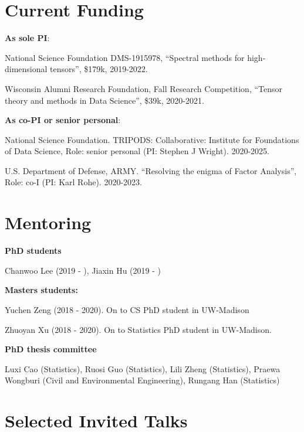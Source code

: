 \documentclass[letterpaper]{article}
\renewenvironment{itemize}{
  \begin{list}{}{
    \setlength{\leftmargin}{1.5em}
  }
}{
  \end{list}
}
\begin{document}
\section*{Current Funding}
{\bf As sole PI}:
\begin{itemize}
\item National Science Foundation DMS-1915978, ``Spectral methods for high-dimensional tensors'', \$179k, 2019-2022. 
\item Wisconsin Alumni Research Foundation, Fall Research Competition, ``Tensor theory and methods in Data Science'', \$39k, 2020-2021.
\end{itemize}
{\bf As co-PI or senior personal}:
\begin{itemize}
\item National Science Foundation. TRIPODS: Collaborative: Institute for Foundations of Data Science, Role: senior personal (PI: Stephen J Wright). 2020-2025. 
\item U.S. Department of Defense, ARMY. ``Resolving the enigma of Factor Analysis'', Role: co-I (PI: Karl Rohe). 2020-2023. 
\end{itemize}


\section*{Mentoring}
{\bf PhD students}
\begin{itemize}
\item Chanwoo Lee (2019 - ), Jiaxin Hu (2019 - )
\end{itemize}
{\bf Masters students:} 
\begin{itemize}
\item Yuchen Zeng (2018 - 2020). On to CS PhD student in UW-Madison
\item  Zhuoyan Xu (2018 - 2020). On to Statistics PhD student in UW-Madison.
\end{itemize}
{\bf PhD thesis committee}
\begin{itemize}
\item Luxi Cao (Statistics), Ruosi Guo (Statistics), Lili Zheng (Statistics), Praewa Wongburi (Civil and Environmental Engineering), Rungang Han (Statistics)
\end{itemize}
\section*{Selected Invited Talks}
\end{document}
